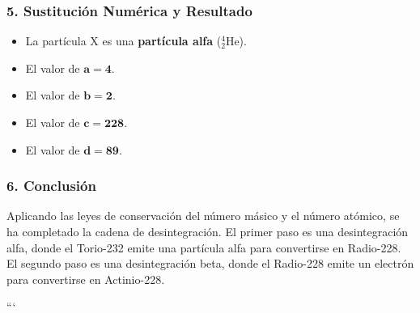 \subsubsection*{5. Sustitución Numérica y Resultado}
\begin{cajaresultado}
\begin{itemize}
    \item La partícula X es una \textbf{partícula alfa} (${}_{2}^{4}\text{He}$).
    \item El valor de $\boldsymbol{a=4}$.
    \item El valor de $\boldsymbol{b=2}$.
    \item El valor de $\boldsymbol{c=228}$.
    \item El valor de $\boldsymbol{d=89}$.
\end{itemize}
\end{cajaresultado}

\subsubsection*{6. Conclusión}
\begin{cajaconclusion}
Aplicando las leyes de conservación del número másico y el número atómico, se ha completado la cadena de desintegración. El primer paso es una desintegración alfa, donde el Torio-232 emite una partícula alfa para convertirse en Radio-228. El segundo paso es una desintegración beta, donde el Radio-228 emite un electrón para convertirse en Actinio-228.
\end{cajaconclusion}

\newpage
```